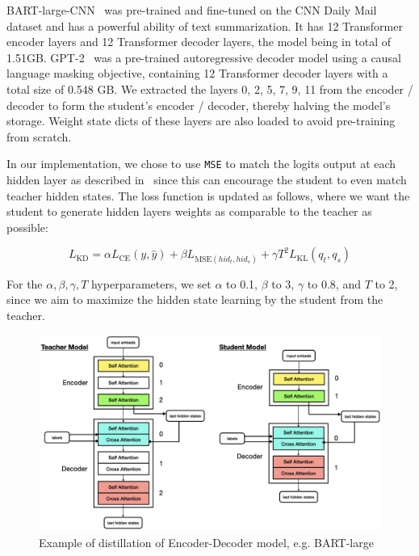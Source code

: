 BART-large-CNN~\cite{lewis2019bart} was pre-trained and fine-tuned on the CNN Daily Mail dataset and has a powerful ability of text summarization.
It has 12 Transformer encoder layers and 12 Transformer decoder layers, the model being in total of 1.51GB\@.
GPT-2~\cite{radford2019language} was a pre-trained autoregressive decoder model using a causal language masking objective,
containing 12 Transformer decoder layers with a total size of 0.548 GB. We extracted the layers 0, 2, 5, 7, 9, 11
from the encoder / decoder to form the student's encoder / decoder, thereby halving the model's storage.
Weight state dicts of these layers are also loaded to avoid pre-training from scratch.

In our implementation, we chose to use \texttt{MSE} to match the logits output at each hidden layer
as described in~\cite{shleifer2020pre} since this can encourage the student to even match teacher hidden states.
The loss function is updated as follows,
where we want the student to generate hidden layers weights as comparable to the teacher as possible:

\begin{equation}
    L_{\text{KD}} = \alpha L_{\text{CE}}(y, \hat{y}) + \beta L_{\text{MSE}(hid_t, hid_s)} + \gamma T^2 L_{\text{KL}}(q_t, q_s)
    \label{eq:kdmse-loss}
\end{equation}

For the $\alpha, \beta, \gamma, T$ hyperparameters, we set $\alpha$ to 0.1, $\beta$ to 3, $\gamma$ to 0.8,
and $T$ to 2, since we aim to maximize the hidden state learning by the student from the teacher.

\begin{figure}[hbpt]
    \centering
    \includegraphics[width=0.9\linewidth]{images/0.001}
    \caption{Example of distillation of Encoder-Decoder model, e.g. BART-large}
    \label{fig:sub1}
\end{figure}

